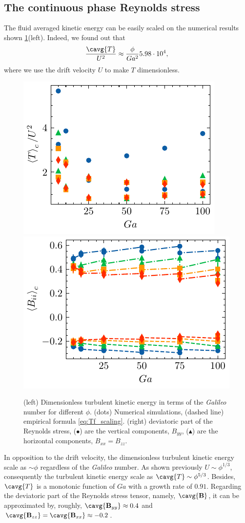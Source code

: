 \subsection{The continuous phase Reynolds stress}
The fluid averaged kinetic energy can be easily scaled on the numerical results shown \ref{fig:Tf_Bf}(left).
Indeed, we found out that 
\begin{equation}
    \frac{\cavg{T}}{U^2} \approx \frac{\phi}{Ga^2}5.98\cdot10^{4} ,
    \label{eq:Tf_scaling}
\end{equation}
where we use the drift velocity $U$ to make $T$ dimensionless. 
\begin{figure}[h!]
    \centering
    \includegraphics[height=0.3\textwidth]{image/HOMOGENEOUS/fCA/Tf.pdf}
    \includegraphics[height=0.3\textwidth]{image/HOMOGENEOUS/fCA/Bf.pdf}
    \caption{(left) Dimensionless turbulent kinetic energy in terms of the \textit{Galileo} number for different $\phi$. (dots) Numerical simulations, (dashed line) empirical formula \ref{eq:Tf_scaling}.
    (right) deviatoric part of the Reynolds stress, ($\bullet$) are the vertical components, $B_{yy}$, ($\blacktriangle$) are the horizontal components, $B_{xx} = B_{zz}$.}
    \label{fig:Tf_Bf}
\end{figure}
In opposition to the drift velocity, the dimensionless turbulent kinetic energy scale as $\sim \phi$ regardless of the \textit{Galileo} number. 
As shown previously $U \sim \phi^{1/3}$, consequently the turbulent kinetic energy scale as $\cavg{T} \sim \phi^{5/3}$. 
Besides, $\cavg{T}$ is a monotonic function of $Ga$ with a growth rate of $0.91$. 
Regarding the deviatoric part of the Reynolds stress tensor, namely, $\cavg{\textbf{B}}$, it can be approximated by, roughly, $\cavg{\textbf{B}_{yy}} \approx 0.4$ and $\cavg{\textbf{B}_{zz}} = \cavg{\textbf{B}_{xx}}  \approx - 0.2$.
